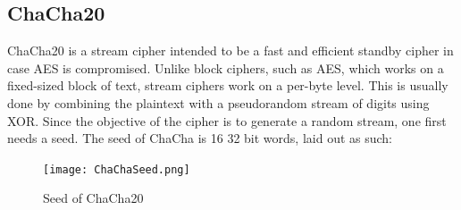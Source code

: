 \documentclass[a4paper]{article}
\begin{document}
\subsection{ChaCha20}
\label{ChaChaalg}
ChaCha20 is a stream cipher intended to be a fast and efficient standby cipher in case AES is compromised. Unlike block ciphers, such as AES, which works on a fixed-sized block of text, stream ciphers work on a per-byte level. This is usually done by combining the plaintext with a pseudorandom stream of digits using XOR. Since the objective of the cipher is to generate a random stream, one first needs a seed. The seed of ChaCha is 16 32 bit words, laid out as such:

\begin{figure}[!htb]
\centering
\texttt{[image: ChaChaSeed.png]}
\caption{Seed of ChaCha20}
\label{fig:ChaChaSeed}
\end{figure}
\end{document}
